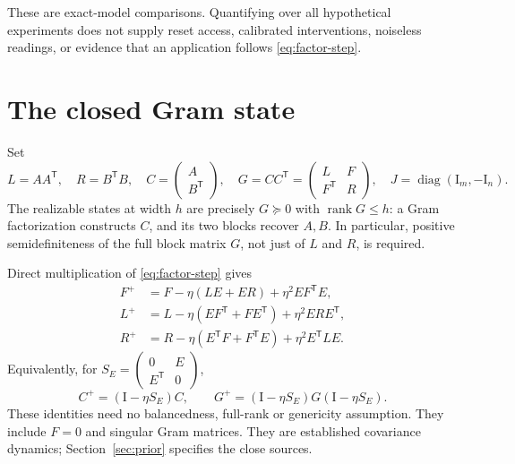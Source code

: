 \documentclass[11pt]{article}
\theoremstyle{remark}\newtheorem{remark}[theorem]{Remark}
\newcommand{\Id}{\mathrm I}
\newcommand{\rank}{\operatorname{rank}}
\newcommand{\diag}{\operatorname{diag}}
\begin{document}
These are exact-model comparisons. Quantifying over all hypothetical
experiments does not supply reset access, calibrated interventions,
noiseless readings, or evidence that an application follows
\eqref{eq:factor-step}.

\section{The closed Gram state}
Set
\begin{equation}\label{eq:gram}
 L=AA^{\mathsf T},\quad R=B^{\mathsf T}B,\quad
 C=\begin{pmatrix}A\\B^{\mathsf T}\end{pmatrix},\quad
 G=CC^{\mathsf T}=\begin{pmatrix}L&F\\F^{\mathsf T}&R\end{pmatrix},
 \quad J=\diag(\Id_m,-\Id_n).
\end{equation}
The realizable states at width $h$ are precisely $G\succeq0$ with
$\rank G\leq h$: a Gram factorization constructs $C$, and its two blocks
recover $A,B$. In particular, positive semidefiniteness of the full block matrix $G$, not just of $L$ and $R$, is required.

Direct multiplication of \eqref{eq:factor-step} gives
\begin{align}
 F^+&=F-\eta(LE+ER)+\eta^2EF^{\mathsf T}E,\label{eq:Fstep}\\
 L^+&=L-\eta(EF^{\mathsf T}+FE^{\mathsf T})+\eta^2ERE^{\mathsf T},
 \label{eq:Lstep}\\
 R^+&=R-\eta(E^{\mathsf T}F+F^{\mathsf T}E)+\eta^2E^{\mathsf T}LE.
 \label{eq:Rstep}
\end{align}
Equivalently, for
$S_E=\left(\begin{smallmatrix}0&E\\E^{\mathsf T}&0\end{smallmatrix}\right)$,
\begin{equation}\label{eq:congruence}
 C^+=(\Id-\eta S_E)C,\qquad
 G^+=(\Id-\eta S_E)G(\Id-\eta S_E).
\end{equation}
These identities need no balancedness, full-rank or genericity assumption.
They include $F=0$ and singular Gram matrices. They are established
covariance dynamics; Section~\ref{sec:prior} specifies the close sources.
\end{document}
